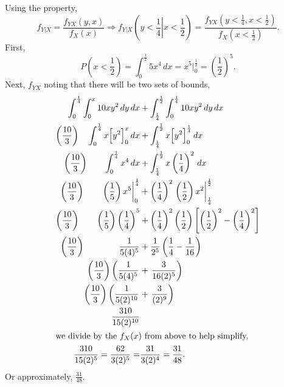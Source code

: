 \documentclass[12pt,letterpaper]{exam}
\begin{document}
\begin{questions}
	\begin{solution}
		Using the property,
		\[ f_{Y|X} = \frac{f_{YX}(y,x)}{f_X(x)} \Rightarrow f_{Y|X}\left(\left.y<\frac{1}{4}\right|x<\frac{1}{2}\right) = \frac{f_{YX}(y<\frac{1}{4},x<\frac{1}{2})}{f_X(x<\frac{1}{2})}. \]
		First,
		\[ P\left(x<\frac{1}{2}\right) = \int_{0}^{\frac{1}{2}} 5x^4 \,dx =  x^5 \Big|_{0}^\frac{1}{2} = \left(\frac{1}{2}\right)^5. \]
		Next, \(f_{YX}\) noting that there will be two sets of bounds,
		\begin{align*}
			\int_{0}^{\frac{1}{4}} \int_{0}^{x} 10xy^2\,dy\,dx	&+ \int_{\frac{1}{4}}^{\frac{1}{2}} \int_{0}^{\frac{1}{4}} 10xy^2\,dy\,dx \\
			\left(\frac{10}{3}\right)\quad  \int_{0}^{\frac{1}{4}} x \Big[y^2\Big]_0^x \,dx	&+ \int_{\frac{1}{4}}^{\frac{1}{2}} x \Big[y^2\Big]_0^\frac{1}{4} \,dx \\
			\left(\frac{10}{3}\right)\qquad  \int_{0}^{\frac{1}{4}} x^4 \,dx	&+ \int_{\frac{1}{4}}^{\frac{1}{2}} x \left(\frac{1}{4}\right)^2 \,dx \\
			\left(\frac{10}{3}\right)\qquad \left.\left(\frac{1}{5}\right) x^5\right|_{0}^{\frac{1}{4}} 	
				&+	\left(\frac{1}{4}\right)^2 \left.\left(\frac{1}{2}\right)x^2\right|_{\frac{1}{4}}^{\frac{1}{2}}  \\
			\left(\frac{10}{3}\right)\qquad \left(\frac{1}{5}\right) \left(\frac{1}{4}\right)^5
			&+	\left(\frac{1}{4}\right)^2 \left(\frac{1}{2}\right) \left[ \left(\frac{1}{2}\right)^2 -\left(\frac{1}{4}\right)^2 \right]  \\
			\left(\frac{10}{3}\right)\qquad\qquad \frac{1}{5(4)^5} &+ \frac{1}{2^5} \left( \frac{1}{4} - \frac{1}{16} \right) \\
			\left( \frac{10}{3} \right) \left( \frac{1}{5(4)^5} \right. &+ \left. \frac{3}{16(2)^5} \right) \\
			\left( \frac{10}{3} \right) \left( \frac{1}{5(2)^{10}} \right. &+ \left. \frac{3}{(2)^9} \right) \\
			\frac{310}{15(2)^{10}} & \\
		\intertext{we divide by the \(f_X(x)\) from above to help simplify,}
			\frac{310}{15(2)^{5}} = \frac{62}{3(2)^{5}} =& \frac{31}{3(2)^{4}}  = \frac{31}{48}. \\
		\end{align*}
		Or approximately, \(\frac{31}{48}\). \\
		
	\end{solution} \clearpage


\end{questions}
\end{document}
